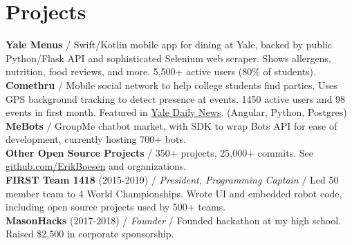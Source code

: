 \documentclass[10pt, a4paper]{article}
\newcommand{\years}[1]{\marginnote{\scriptsize #1}}
\begin{document}
\section*{Projects}
\textbf{Yale Menus} / Swift/Kotlin mobile app for dining at Yale, backed by public Python/Flask API and sophisticated Selenium web scraper. Shows allergens, nutrition, food reviews, and more. 5,500+ active users (80\% of students).\\
\textbf{Comethru} / Mobile social network to help college students find parties. Uses GPS background tracking to detect presence at events. 1450 active users and 98 events in first month. Featured in \href{https://yaledailynews.com/blog/2020/01/22/new-events-app-comethru-launches}{Yale Daily News}. (Angular, Python, Postgres)\\
\textbf{MeBots} / GroupMe chatbot market, with SDK to wrap Bots API for ease of development, currently hosting 700+ bots.\\
\textbf{Other Open Source Projects} / 350+ projects, 25,000+ commits. See \href{https://github.com/ErikBoesen}{github.com/ErikBoesen} and organizations.\\
\textbf{FIRST Team 1418} (2015-2019) / \textit{President, Programming Captain} / Led 50 member team to 4 World Championships. Wrote UI and embedded robot code, including open source projects used by 500+ teams.\\
\textbf{MasonHacks} (2017-2018) / \textit{Founder} / Founded hackathon at my high school. Raised \$2,500 in corporate sponsorship.\\
\end{document}
